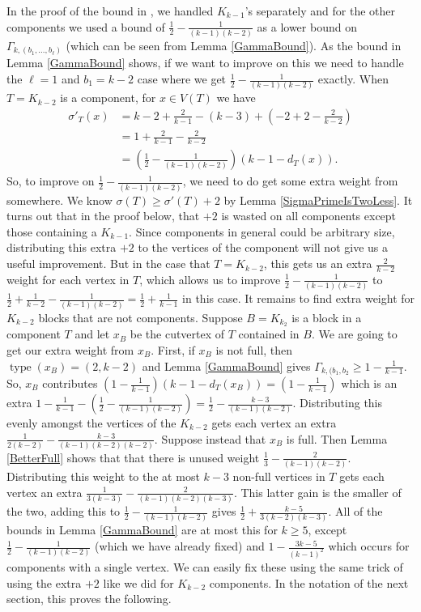 \documentclass[12pt]{article}
\theoremstyle{plain}
\theoremstyle{definition}
\theoremstyle{remark}
\newcommand{\parens}[1]{\left( #1 \right)}
\newcommand{\type}{\operatorname{type}}
\begin{document}
In the proof of the bound in \cite{OreVizing}, we handled $K_{k-1}$'s separately and for the other components we used a bound of $\frac12 - \frac{1}{(k-1)(k-2)}$ as a lower bound on $\Gamma_{k,(b_1,\ldots,b_{\ell})}$ (which can be seen from Lemma \ref{GammaBound}).  As the bound in Lemma \ref{GammaBound} shows, if we want to improve on this we need to handle the $\ell = 1$ and $b_1=k-2$ case where we get $\frac12 - \frac{1}{(k-1)(k-2)}$ exactly.  When $T=K_{k-2}$ is a component, for $x \in V(T)$ we have
\begin{align*}
\sigma'_T(x) &= k-2 + \frac{2}{k-1} - (k-3) + \parens{-2 + 2 - \frac{2}{k-2}}\\
&=1 + \frac{2}{k-1} - \frac{2}{k-2}\\
&=\parens{\frac12 - \frac{1}{(k-1)(k-2)}}(k-1-d_T(x)).
\end{align*}
So, to improve on $\frac12 - \frac{1}{(k-1)(k-2)}$, we need to do get some extra weight from somewhere.  We know $\sigma(T) \ge \sigma'(T) + 2$ by Lemma \ref{SigmaPrimeIsTwoLess}.  It turns out that in the proof below, that $+2$ is wasted on all components except those containing a $K_{k-1}$.  Since components in general could be arbitrary size, distributing this extra $+2$ to the vertices of the component will not give us a useful improvement.  But in the case that $T=K_{k-2}$, this gets us an extra $\frac{2}{k-2}$ weight for each vertex in $T$, which allows us to improve $\frac12 - \frac{1}{(k-1)(k-2)}$ to $\frac12 + \frac{1}{k-2} - \frac{1}{(k-1)(k-2)} = \frac12 + \frac{1}{k-1}$ in this case.  It remains to find extra weight for $K_{k-2}$ blocks that are not components.  Suppose $B=K_{k_2}$ is a block in a component $T$ and let $x_B$ be the cutvertex of $T$ contained in $B$.  We are going to get our extra weight from $x_B$.  First, if $x_B$ is not full, then $\type(x_B) = (2, k-2)$ and Lemma \ref{GammaBound} gives $\Gamma_{k,(b_1,b_2} \ge 1 - \frac{1}{k-1}$.  So, $x_B$ contributes $\parens{1 - \frac{1}{k-1}}(k-1 - d_T(x_B)) = \parens{1 - \frac{1}{k-1}}$ which is an extra $1 - \frac{1}{k-1} - \parens{\frac12 - \frac{1}{(k-1)(k-2)}} = \frac12 - \frac{k-3}{(k-1)(k-2)}$.  Distributing this evenly amongst the vertices of the $K_{k-2}$ gets each vertex an extra $\frac{1}{2(k-2)} - \frac{k-3}{(k-1)(k-2)(k-2)}$.  Suppose instead that $x_B$ is full.  Then Lemma \ref{BetterFull} shows that that there is unused weight $\frac13 - \frac{2}{(k-1)(k-2)}$.  Distributing this weight to the at most $k-3$ non-full vertices in $T$ gets each vertex an extra $\frac{1}{3(k-3)} - \frac{2}{(k-1)(k-2)(k-3)}$.  This latter gain is the smaller of the two, adding this to  $\frac12 - \frac{1}{(k-1)(k-2)}$ gives $\frac12 + \frac{k-5}{3(k-2)(k-3)}$.  All of the bounds in Lemma \ref{GammaBound} are at most this for $k \ge 5$, except $\frac12 - \frac{1}{(k-1)(k-2)}$ (which we have already fixed) and $1 - \frac{3k-5}{(k-1)^2}$ which occurs for components with a single vertex.  We can easily fix these using the same trick of using the extra $+2$ like we did for $K_{k-2}$ components.  In the notation of the next section, this proves the following.
\end{document}
